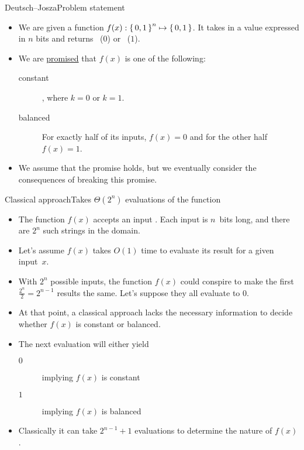 \begin{frame}{Deutsch--Josza}{Problem statement}
\begin{itemize}[<+->]
    \item We are given a function $f(x): \left\{\,0,1\,\right\}^{n}\mapsto \left\{\,0,1\,\right\}$.  It takes in a value expressed in $n$ bits and returns \False{}~($0$) or \True~($1$).
    \item We are \href{https://en.wikipedia.org/wiki/Promise_problem}{promised} that $f(x)$ is one of the following:
    \begin{description}
        \item[constant]  , where $k=0$ or $k=1$.
        \item[balanced]  For exactly half of its inputs, $f(x) = 0$ and for the other half $f(x) = 1$.
    \end{description}
    \item We assume that the promise holds, but we eventually consider the consequences of breaking this promise.
\end{itemize}
\end{frame}

\begin{frame}{Classical approach}{Takes $\Theta(2^{n})$ evaluations of the function}

\begin{itemize}[<+->]
    \item The function $f(x)$ accepts an input .  Each input is $n$~bits long, and there are $2^n$ such strings in the domain.
    \item Let's assume $f(x)$ takes $O(1)$ time
    to evaluate its result for a given input~$x$.
    \item With $2^{n}$ possible inputs, the function $f(x)$ could conspire to make the first $\frac{2^n}{2}=2^{n-1}$ results the same.  Let's suppose they all evaluate to $0$.
    \item At that point, a classical approach lacks the necessary information to decide whether $f(x)$ is constant or balanced.
    \item The next evaluation will either yield
    \begin{description}
      \item[$0$] implying $f(x)$ is constant
      \item[$1$] implying $f(x)$ is balanced
    \end{description}
    \item Classically it can take $2^{n-1}+1$ evaluations to determine the nature of $f(x)$.
\end{itemize}
    
\end{frame}

